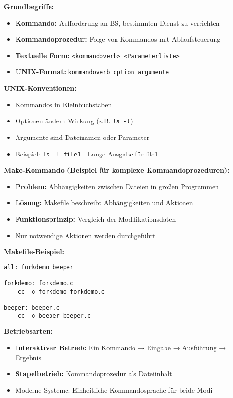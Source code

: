 \documentclass[9pt,a4paper]{extarticle}
\begin{document}
\begin{multicols*}{2}
\textbf{Grundbegriffe:}
\begin{itemize}
\item \textbf{Kommando:} Aufforderung an BS, bestimmten Dienst zu verrichten
\item \textbf{Kommandoprozedur:} Folge von Kommandos mit Ablaufsteuerung
\item \textbf{Textuelle Form:} \texttt{<kommandoverb> <Parameterliste>}
\item \textbf{UNIX-Format:} \texttt{kommandoverb option argumente}
\end{itemize}

\textbf{UNIX-Konventionen:}
\begin{itemize}
\item Kommandos in Kleinbuchstaben
\item Optionen ändern Wirkung (z.B. \texttt{ls -l})
\item Argumente sind Dateinamen oder Parameter
\item Beispiel: \texttt{ls -l file1} - Lange Ausgabe für file1
\end{itemize}

\textbf{Make-Kommando (Beispiel für komplexe Kommandoprozeduren):}
\begin{itemize}
\item \textbf{Problem:} Abhängigkeiten zwischen Dateien in großen Programmen
\item \textbf{Lösung:} Makefile beschreibt Abhängigkeiten und Aktionen
\item \textbf{Funktionsprinzip:} Vergleich der Modifikationsdaten
\item Nur notwendige Aktionen werden durchgeführt
\end{itemize}

\textbf{Makefile-Beispiel:}
\begin{verbatim}
all: forkdemo beeper

forkdemo: forkdemo.c
    cc -o forkdemo forkdemo.c

beeper: beeper.c
    cc -o beeper beeper.c
\end{verbatim}

\textbf{Betriebsarten:}
\begin{itemize}
\item \textbf{Interaktiver Betrieb:} Ein Kommando → Eingabe → Ausführung → Ergebnis
\item \textbf{Stapelbetrieb:} Kommandoprozedur als Dateiinhalt
\item Moderne Systeme: Einheitliche Kommandosprache für beide Modi
\end{itemize}


\end{multicols*}
\end{document}
